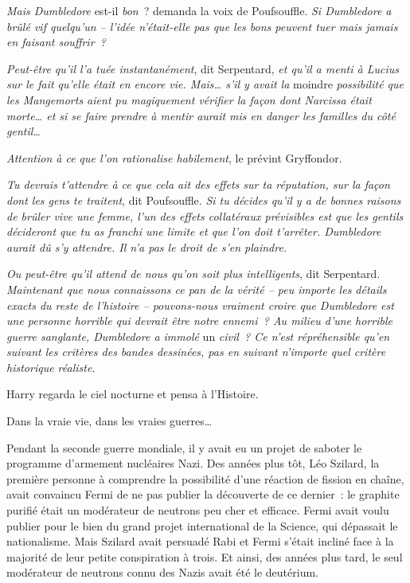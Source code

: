 \emph{Mais Dumbledore} est-il \emph{bon}~? demanda la voix de Poufsouffle. \emph{Si Dumbledore a brûlé vif quelqu'un -- l'idée n'était-elle pas que les bons peuvent tuer mais jamais en faisant souffrir~?}

\emph{Peut-être qu'il l'a tuée instantanément}, dit Serpentard, \emph{et qu'il a menti à Lucius sur le fait qu'elle était en encore vie. Mais… s'il y avait la} moindre \emph{possibilité que les Mangemorts aient pu magiquement vérifier la façon dont Narcissa était morte… et si se faire prendre à mentir aurait mis en danger les familles du côté gentil…}

\emph{Attention à ce que l'on rationalise habilement}, le prévint Gryffondor.

\emph{Tu devrais t'attendre à ce que cela ait des effets sur ta réputation, sur la façon dont les gens te traitent}, dit Poufsouffle. \emph{Si tu décides qu'il y a de bonnes raisons de brûler vive une femme, l'un des effets collatéraux prévisibles est que les gentils décideront que tu as franchi une limite et que l'on doit t'arrêter. Dumbledore aurait dû s'y attendre. Il n'a pas le droit de s'en plaindre.}

\emph{Ou peut-être qu'il attend de nous qu'on soit plus intelligents}, dit Serpentard. \emph{Maintenant que nous connaissons ce pan de la vérité -- peu importe les détails exacts du reste de l'histoire -- pouvons-nous vraiment croire que Dumbledore est une personne horrible qui devrait être notre ennemi~? Au milieu d'une horrible guerre sanglante, Dumbledore a immolé} un \emph{civil~? Ce n'est répréhensible qu'en suivant les critères des bandes dessinées, pas en suivant n'importe quel critère historique réaliste.}

Harry regarda le ciel nocturne et pensa à l'Histoire.

Dans la vraie vie, dans les vraies guerres…

Pendant la seconde guerre mondiale, il y avait eu un projet de saboter le programme d'armement nucléaires Nazi. Des années plus tôt, Léo Szilard, la première personne à comprendre la possibilité d'une réaction de fission en chaîne, avait convaincu Fermi de ne pas publier la découverte de ce dernier~: le graphite purifié était un modérateur de neutrons peu cher et efficace. Fermi avait voulu publier pour le bien du grand projet international de la Science, qui dépassait le nationalisme. Mais Szilard avait persuadé Rabi et Fermi s'était incliné face à la majorité de leur petite conspiration à trois. Et ainsi, des années plus tard, le seul modérateur de neutrons connu des Nazis avait été le deutérium.

